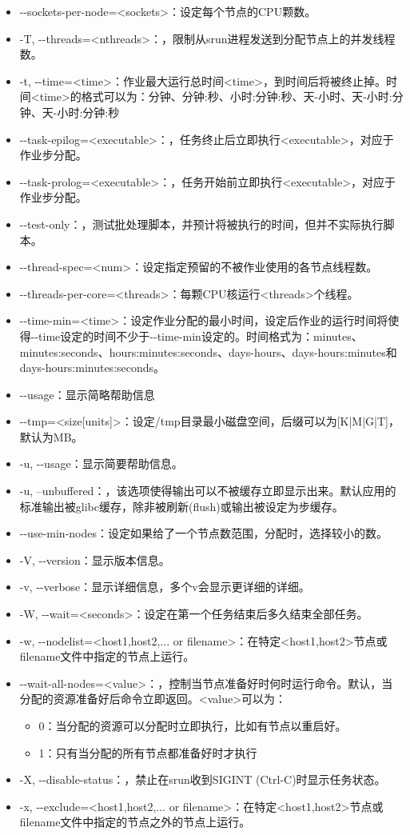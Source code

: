 \begin{itemize}
    \item -{}-sockets-per-node=<sockets>：设定每个节点的CPU颗数。
	\item -T, -{}-threads=<nthreads>：，限制从srun进程发送到分配节点上的并发线程数。
	\item -t, -{}-time=<time>：作业最大运行总时间<time>，到时间后将被终止掉。时间<time>的格式可以为：分钟、分钟:秒、小时:分钟:秒、天-小时、天-小时:分钟、天-小时:分钟:秒
	\item -{}-task-epilog=<executable>：，任务终止后立即执行<executable>，对应于作业步分配。
	\item -{}-task-prolog=<executable>：，任务开始前立即执行<executable>，对应于作业步分配。
	\item -{}-test-only：，测试批处理脚本，并预计将被执行的时间，但并不实际执行脚本。
	\item -{}-thread-spec=<num>：设定指定预留的不被作业使用的各节点线程数。
\item -{}-threads-per-core=<threads>：每颗CPU核运行<threads>个线程。
	\item -{}-time-min=<time>：设定作业分配的最小时间，设定后作业的运行时间将使得-{}-time设定的时间不少于-{}-time-min设定的。时间格式为：minutes、minutes:seconds、hours:minutes:seconds、days-hours、days-hours:minutes和days-hours:minutes:seconds。
	\item -{}-usage：显示简略帮助信息
	\item -{}-tmp=<size[units]>：设定/tmp目录最小磁盘空间，后缀可以为[K|M|G|T]，默认为MB。
	\item -u, -{}-usage：显示简要帮助信息。
	\item -u, --unbuffered：，该选项使得输出可以不被缓存立即显示出来。默认应用的标准输出被glibc缓存，除非被刷新(flush)或输出被设定为步缓存。
	\item -{}-use-min-nodes：设定如果给了一个节点数范围，分配时，选择较小的数。
	\item -V, -{}-version：显示版本信息。
	\item -v, -{}-verbose：显示详细信息，多个v会显示更详细的详细。
	\item -W, -{}-wait=<seconds>：设定在第一个任务结束后多久结束全部任务。
	\item -w, -{}-nodelist=<host1,host2,... or filename>：在特定<host1,host2>节点或filename文件中指定的节点上运行。
	\item -{}-wait-all-nodes=<value>：，控制当节点准备好时何时运行命令。默认，当分配的资源准备好后命令立即返回。<value>可以为：
	\begin{itemize}
		\item 0：当分配的资源可以分配时立即执行，比如有节点以重启好。
		\item 1：只有当分配的所有节点都准备好时才执行
	\end{itemize}
	\item -X, -{}-disable-status：，禁止在srun收到SIGINT (Ctrl-C)时显示任务状态。
	\item -x, -{}-exclude=<host1,host2,... or filename>：在特定<host1,host2>节点或filename文件中指定的节点之外的节点上运行。
\end{itemize}

